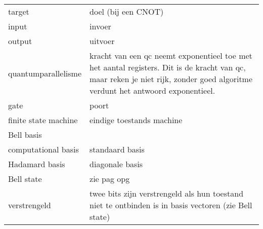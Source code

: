\documentclass[../../main.tex]{subfiles}
\begin{document}
\begin{table}[h!]
\begin{tabular}{|l|l|}
target & doel (bij een CNOT) \\
input & invoer \\

output & uitvoer\\
quantumparallelisme& kracht van een qc neemt exponentieel toe met het aantal registers. Dit is de kracht van qc, maar reken je niet rijk, zonder goed algoritme verdunt het antwoord exponentieel.\\
gate & poort\\

finite state machine & eindige toestands machine\\

Bell basis &\\
computational basis &standaard basis\\
Hadamard basis&diagonale basis\\
Bell state& zie pag opg\\
verstrengeld& twee bits zijn verstrengeld als hun toestand niet te ontbinden is in basis vectoren (zie Bell state)
\end{tabular}
\end{table}
\end{document}
